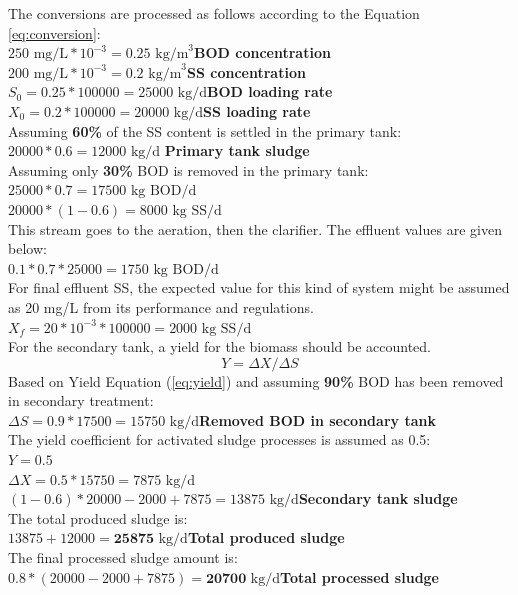 \documentclass[a4paper]{article}
\begin{document}
The conversions are processed as follows according to the Equation \ref{eq:conversion}:\\
$250 \text{ mg/L}*10^{-3}=0.25 \text{ kg/m}^3$\hfill \textbf{BOD concentration}\\
$200 \text{ mg/L}*10^{-3}=0.2 \text{ kg/m}^3$\hfill \textbf{SS concentration}\\
$S_0=0.25*100000=25000\text{ kg/d}$\hfill \textbf{BOD loading rate}\\
$X_0=0.2*100000=20000 \text{ kg/d}$\hfill \textbf{SS loading rate}\\
Assuming \textbf{60\%} of the SS content is settled in the primary tank:\\
$20000*0.6=12000 \text{ kg/d}$ \hfill \textbf{Primary tank sludge}\\
Assuming only \textbf{30\%} BOD is removed in the primary tank:\\
$25000*0.7=17500\text{ kg BOD/d}$\\
$20000*(1-0.6)=8000\text{ kg SS/d}$\\
This stream goes to the aeration, then the clarifier. The effluent values are given below:\\
$0.1*0.7*25000=1750 \text{ kg BOD/d}$\\
For final effluent SS, the expected value for this kind of system might be assumed as 20 mg/L from its performance and regulations.\\
$X_f = 20*10^{-3}*100000=2000\text{ kg SS/d}$\\
For the secondary tank, a yield for the biomass should be accounted.
\begin{equation}
    Y = {\Delta}X / {\Delta}S \label{eq:yield}
\end{equation}
Based on Yield Equation (\ref{eq:yield}) and assuming \textbf{90\%} BOD has been removed in secondary treatment:\\
$\Delta S = 0.9*17500 = 15750\text{ kg/d}$\hfill \textbf{Removed BOD in secondary tank}\\
The yield coefficient for activated sludge processes is assumed as 0.5:\\
$Y = 0.5$\\
$\Delta X = 0.5 * 15750 = 7875\text{ kg/d}$\\
$(1-0.6)*20000-2000+7875=13875\text{ kg/d}$\hfill\textbf{Secondary tank sludge}\\
The total produced sludge is:\\
$13875+12000=\textbf{25875}\text{ kg/d}$\hfill\textbf{Total produced sludge}\\
The final processed sludge amount is:\\
$0.8*(20000-2000+7875) = \textbf{20700}\text{ kg/d}$\hfill\textbf{Total processed sludge}
\end{document}
